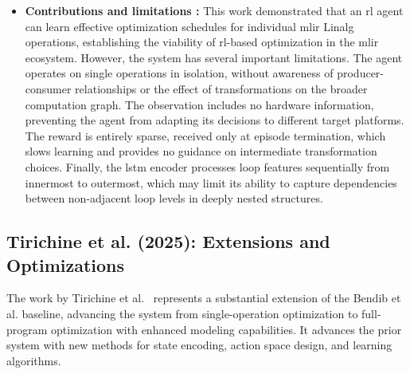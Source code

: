 \begin{itemize}
The policy network follows an actor-critic architecture. The operation features are processed through a multi-layer perceptron, producing an intermediate representation that is then passed through an \gls{lstm} to produce a fixed-size embedding vector encapsulating sequential dependencies across loop levels. A shared backbone network processes this embedding before branching into the action-type selection head, per-action parameter heads (one for each action type), and a value head that estimates the expected return from the current state. The \gls{ppo} algorithm~\cite{schulman2017ppo} is used for training, with Generalized Advantage Estimation~\cite{schulman2015gae} for computing advantage estimates.

\item \textbf{Contributions and limitations :} This work demonstrated that an \gls{rl} agent can learn effective optimization schedules for individual \gls{mlir} Linalg operations, establishing the viability of \gls{rl}-based optimization in the \gls{mlir} ecosystem. However, the system has several important limitations. The agent operates on single operations in isolation, without awareness of producer-consumer relationships or the effect of transformations on the broader computation graph. The observation includes no hardware information, preventing the agent from adapting its decisions to different target platforms. The reward is entirely sparse, received only at episode termination, which slows learning and provides no guidance on intermediate transformation choices. Finally, the \gls{lstm} encoder processes loop features sequentially from innermost to outermost, which may limit its ability to capture dependencies between non-adjacent loop levels in deeply nested structures.
\end{itemize}

\subsection{Tirichine et al. (2025): Extensions and Optimizations}

The work by Tirichine et al.~\cite{tirichine2025reinforcement} represents a substantial extension of the Bendib et al. baseline, advancing the system from single-operation optimization to full-program optimization with enhanced modeling capabilities. It advances the prior system with new methods for state encoding, action space design, and learning algorithms.

